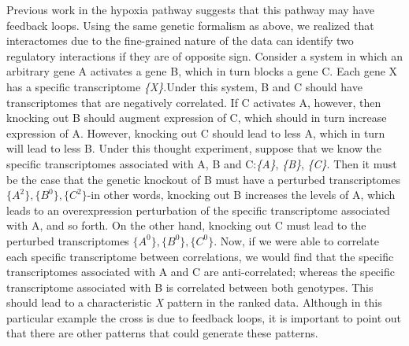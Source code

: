 \documentclass[9pt,twocolumn,twoside]{pnas-new}
\begin{document}
Previous work in the hypoxia pathway suggests that this pathway may have feedback loops. Using the same genetic formalism as above, we realized that interactomes due to the fine-grained nature of the data can identify two regulatory interactions if they are of opposite sign. Consider a system in which an arbitrary gene A activates a gene B, which in turn blocks a gene C. Each gene X has a specific transcriptome \emph{\{X\}}.Under this system, B and C should have transcriptomes that are negatively correlated. If C activates A, however, then knocking out B should augment expression of C, which should in turn increase expression of A.
However, knocking out C should lead to less A, which in turn will lead to less B. Under this thought experiment, suppose that we know the specific transcriptomes associated with A, B and C:\@\emph{\{A\}}, \emph{\{B\}}, \emph{\{C\}}. Then it must be the case that the genetic knockout of B must have a perturbed transcriptomes $\{A^2\}, \{B^0\}, \{C^2\}$-in other words, knocking out B increases the levels of A, which leads to an overexpression perturbation of the specific transcriptome associated with A, and so forth. On the other hand, knocking out C must lead to the perturbed transcriptomes $\{A^0\}, \{B^0\}, \{C^0\}$.
Now, if we were able to correlate each specific transcriptome between correlations, we would find that the specific transcriptomes associated with A and C are anti-correlated; whereas the specific transcriptome associated with B is correlated between both genotypes. This should lead to a characteristic \emph{X} pattern in the ranked data. Although in this particular example the cross is due to feedback loops, it is important to point out that there are other patterns that could generate these patterns.
\end{document}
